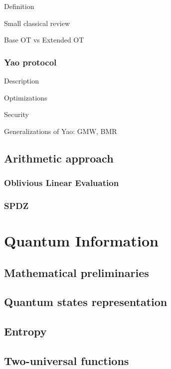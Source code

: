 Definition

Small classical review 

Base OT vs Extended OT

\subsubsection{Yao protocol}

Description

Optimizations

Security

Generalizations of Yao: GMW, BMR

\subsection{Arithmetic approach}

\subsubsection{Oblivious Linear Evaluation}

\subsubsection{SPDZ}





\section{Quantum Information}


\subsection{Mathematical preliminaries}

\subsection{Quantum states representation}

\subsection{Entropy}

\subsection{Two-universal functions}

